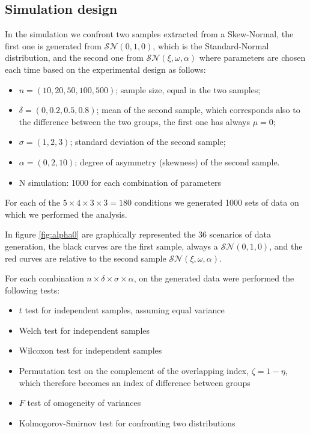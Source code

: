 \documentclass[10pt]{article}\usepackage[]{graphicx}\usepackage[]{xcolor}
\begin{document}
\subsection{Simulation design}





In the simulation we confront two samples extracted from a Skew-Normal, the first one is generated from $\mathcal{SN}(0,1,0)$, which is the Standard-Normal distribution, and the second one from $\mathcal{SN}(\xi,\omega,\alpha)$ where parameters are chosen each time based on the experimental design as follows:


\begin{itemize}

  \item $n = (10, 20, 50, 100, 500)$; sample size, equal in the two samples;
  \item $\delta = (0, 0.2, 0.5, 0.8)$; mean of the second sample, which corresponds also to the difference between the two groups, the first one has always $\mu = 0$;
  \item $\sigma = (1, 2, 3)$; standard deviation of the second sample;
  \item $\alpha = (0, 2, 10)$; degree of asymmetry (skewness) of the second sample. 
  \item N simulation: 1000 for each combination of parameters

\end{itemize}


For each of the $5 \times 4 \times 3 \times 3 = 180$ conditions we generated 1000 sets of data on which we performed the analysis.

In figure \ref{fig:alpha0} are graphically represented the 36 scenarios of data generation, the black curves are the first sample, always a $\mathcal{SN}(0,1,0)$, and the red curves are relative to the second sample $\mathcal{SN}(\xi,\omega,\alpha)$.

For each combination $n \times \delta \times \sigma \times \alpha$, on the generated data were performed the following tests: 
\begin{itemize}
 \item $t$ test for independent samples, assuming equal variance
 \item Welch test for independent samples 
 \item Wilcoxon test for independent samples
 \item Permutation test on the complement of the overlapping index, $\zeta = 1-\eta$, which therefore becomes an index of difference between groups
 \item $F$ test of omogeneity of variances
 \item Kolmogorov-Smirnov test for confronting two distributions
\end{itemize}
\end{document}
